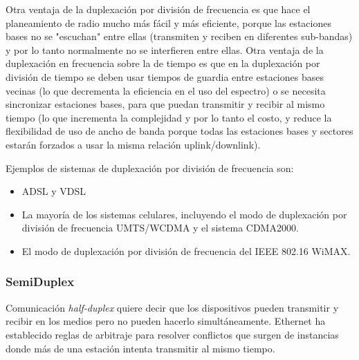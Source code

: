 \documentclass[a4paper]{article}
\begin{document}
	Otra ventaja de la duplexación por división de frecuencia es que hace el planeamiento de radio mucho más fácil y más eficiente, porque las estaciones bases no se "escuchan" entre ellas (transmiten y reciben en diferentes sub-bandas) y por lo tanto normalmente no se interfieren entre ellas. Otra ventaja de la duplexación en frecuencia sobre la de tiempo es que en la duplexación por división de tiempo se deben usar tiempos de guardia entre estaciones bases vecinas (lo que decrementa la eficiencia en el uso del espectro) o se necesita sincronizar estaciones bases, para que puedan transmitir y recibir al mismo tiempo (lo que incrementa la complejidad y por lo tanto el costo, y reduce la flexibilidad de uso de ancho de banda porque todas las estaciones bases y sectores estarán forzados a usar la misma relación uplink/downlink).
	
	Ejemplos de sistemas de duplexación por división de frecuencia son:
	
	\begin{itemize}
		\item ADSL y VDSL
		\item La mayoría de los sistemas celulares, incluyendo el modo de duplexación por división de frecuencia UMTS/WCDMA y el sistema CDMA2000.
		\item El modo de duplexación por división de frecuencia del IEEE 802.16 WiMAX.
	\end{itemize}
	
	\subsubsection{SemiDuplex}	
	Comunicación \textit{half-duplex} quiere decir que los dispositivos pueden transmitir y recibir en los medios pero no pueden hacerlo simultáneamente. Ethernet ha establecido reglas de arbitraje para resolver conflictos que surgen de instancias donde más de una estación intenta transmitir al mismo tiempo.
	
	\noindent{}
	
\end{document}
